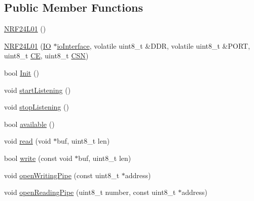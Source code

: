 \subsection*{Public Member Functions}
\begin{DoxyCompactItemize}
\item 
\hyperlink{classNRF24L01_ad3e6263e0afaa974637d1450b6c8cb37}{N\+R\+F24\+L01} ()
\item 
\hyperlink{classNRF24L01_a8e8e6754c34cf6e6fed554a6e26c8a4b}{N\+R\+F24\+L01} (\hyperlink{classIO}{IO} $\ast$\hyperlink{classNRF24L01_ae1eea9f32346ecf60ffbf5224d338359}{io\+Interface}, volatile uint8\+\_\+t \&D\+DR, volatile uint8\+\_\+t \&P\+O\+RT, uint8\+\_\+t \hyperlink{main_8cpp_af332f65aca07c44deeda884c8f6c353c}{CE}, uint8\+\_\+t \hyperlink{main_8cpp_a8df4f3a8a2035df063402ae5f0c1d2f8}{C\+SN})
\item 
bool \hyperlink{classNRF24L01_a2973773d1a158e1cfbf52198f248c548}{Init} ()
\item 
void \hyperlink{classNRF24L01_aaabd39829998b609c0dc317af4f141b2}{start\+Listening} ()
\item 
void \hyperlink{classNRF24L01_a6ad13189b732f237ac148c659ddf6b01}{stop\+Listening} ()
\item 
bool \hyperlink{classNRF24L01_ab368039cf5448f0ff5d489563d530c7b}{available} ()
\item 
void \hyperlink{classNRF24L01_a60ed6c6e072a1f41ca560546745ec6da}{read} (void $\ast$buf, uint8\+\_\+t len)
\item 
bool \hyperlink{classNRF24L01_a719390c69a2e45df08379f17e3289f4c}{write} (const void $\ast$buf, uint8\+\_\+t len)
\item 
void \hyperlink{classNRF24L01_ad64a887cae746be5ca43cf08445feed9}{open\+Writing\+Pipe} (const uint8\+\_\+t $\ast$address)
\item 
void \hyperlink{classNRF24L01_a9b458f77f6ae6c42f330710e703dd847}{open\+Reading\+Pipe} (uint8\+\_\+t number, const uint8\+\_\+t $\ast$address)
\end{DoxyCompactItemize}
